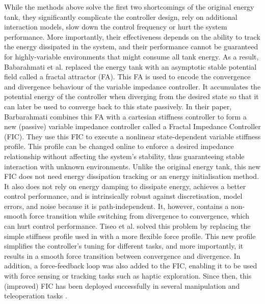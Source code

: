 While the methods above solve the first two shortcomings of the original energy tank, they significantly complicate the controller design, rely on additional interaction models, slow down the control frequency or hurt the system performance. More importantly, their effectiveness depends on the ability to track the energy dissipated in the system, and their performance cannot be guaranteed for highly-variable environments that might consume all tank energy. As a result, Babarahmati et al. \cite{babarahmatiFractalImpedancePassive2021} replaced the energy tank with an asymptotic stable potential field called a fractal attractor (FA). This FA is used to encode the convergence and divergence behaviour of the variable impedance controller. It accumulates the potential energy of the controller when diverging from the desired state so that it can later be used to converge back to this state passively. In their paper, Barbarahmati combines this FA with a cartesian stiffness controller to form a new (passive) variable impedance controller called a Fractal Impedance Controller (FIC). They use this FIC to execute a nonlinear state-dependent variable stiffness profile. This profile can be changed online to enforce a desired impedance relationship without affecting the system's stability, thus guaranteeing stable interaction with unknown environments. Unlike the original energy tank, this new FIC does not need energy dissipation tracking or an energy initialisation method. It also does not rely on energy damping to dissipate energy, achieves a better control performance, and is intrinsically robust against discretisation, model errors, and noise because it is path-independent. It, however, contains a non-smooth force transition while switching from divergence to convergence, which can hurt control performance. Tiseo et al. \cite{tiseoBiomimeticAdaptiveForce2020} solved this problem by replacing the simple stiffness profile used in \cite{babarahmatiFractalImpedancePassive2021} with a more flexible force profile. This new profile simplifies the controller's tuning for different tasks, and more importantly, it results in a smooth force transition between convergence and divergence. In addition, a force-feedback loop was also added to the FIC, enabling it to be used with force sensing or tracking tasks such as haptic exploration. Since then, this (improved) FIC has been deployed successfully in several manipulation and teleoperation tasks \cite{tiseoRobustImpedanceControl2022,tiseoFineManipulationDynamic2022,tiseoAchievingDexterousBidirectional2022,tiseoGeometricalPosturalOptimisation2022,babarahmatiRobustHighTransparencyHaptic2021,tiseoSafeCompliantControl2020}.

